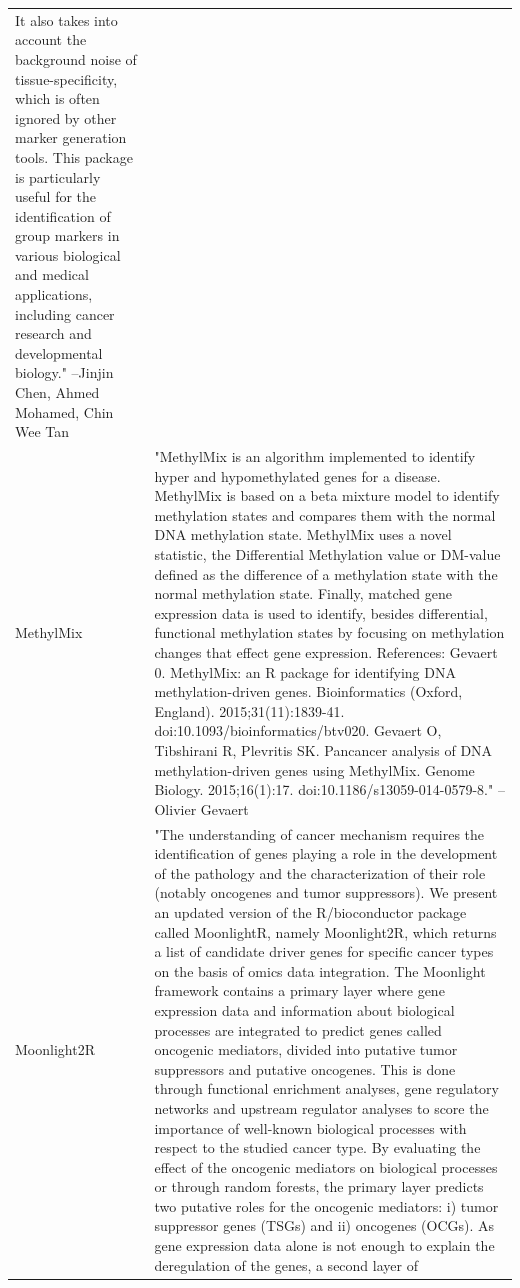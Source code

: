 \documentclass[]{article}
\begin{document}
\begin{longtable}[t]{l>{\raggedright\arraybackslash}p{25em}}
It also takes into account the background noise of
tissue-specificity, which is often ignored by other marker
generation tools. This package is particularly useful for the
identification of group markers in various biological and
medical applications, including cancer research and
developmental biology." --Jinjin Chen, Ahmed Mohamed, Chin Wee Tan\\
MethylMix & "MethylMix is an algorithm implemented to identify hyper
and hypomethylated genes for a disease. MethylMix is based on a
beta mixture model to identify methylation states and compares
them with the normal DNA methylation state. MethylMix uses a
novel statistic, the Differential Methylation value or DM-value
defined as the difference of a methylation state with the
normal methylation state. Finally, matched gene expression data
is used to identify, besides differential, functional
methylation states by focusing on methylation changes that
effect gene expression. References: Gevaert 0. MethylMix: an R
package for identifying DNA methylation-driven genes.
Bioinformatics (Oxford, England). 2015;31(11):1839-41.
doi:10.1093/bioinformatics/btv020. Gevaert O, Tibshirani R,
Plevritis SK. Pancancer analysis of DNA methylation-driven
genes using MethylMix. Genome Biology. 2015;16(1):17.
doi:10.1186/s13059-014-0579-8." --Olivier Gevaert\\
\addlinespace
Moonlight2R & "The understanding of cancer mechanism requires the
identification of genes playing a role in the development of
the pathology and the characterization of their role (notably
oncogenes and tumor suppressors). We present an updated version
of the R/bioconductor package called MoonlightR, namely
Moonlight2R, which returns a list of candidate driver genes for
specific cancer types on the basis of omics data integration.
The Moonlight framework contains a primary layer where gene
expression data and information about biological processes are
integrated to predict genes called oncogenic mediators, divided
into putative tumor suppressors and putative oncogenes. This is
done through functional enrichment analyses, gene regulatory
networks and upstream regulator analyses to score the
importance of well-known biological processes with respect to
the studied cancer type. By evaluating the effect of the
oncogenic mediators on biological processes or through random
forests, the primary layer predicts two putative roles for the
oncogenic mediators: i) tumor suppressor genes (TSGs) and ii)
oncogenes (OCGs). As gene expression data alone is not enough
to explain the deregulation of the genes, a second layer of

\end{longtable}
\end{document}
